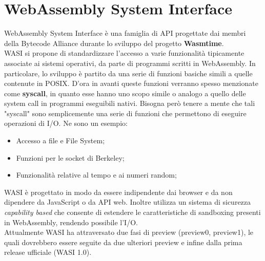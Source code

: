 \section{WebAssembly System Interface}
\label{sec:WASI}
WebAssembly System Interface è una famiglia di API progettate dai membri della Bytecode Alliance durante lo sviluppo del progetto \textbf{Wasmtime}.\cite*{wasiHome}
\\WASI si propone di standardizzare l'accesso a varie funzionalità tipicamente associate ai sistemi operativi, da parte di programmi scritti in WebAssembly.
In particolare, lo sviluppo è partito da una serie di funzioni basiche simili a quelle contenute in POSIX.
D'ora in avanti queste funzioni verranno spesso menzionate come \textbf{syscall}, in quanto esse hanno uno scopo simile o analogo a quello delle system call in programmi eseguibili nativi.
Bisogna però tenere a mente che tali "syscall" sono semplicemente una serie di funzioni che permettono di eseguire operazioni di I/O. Ne sono un esempio:
\begin{itemize}
        \item Accesso a file e File System;
        \item Funzioni per le socket di Berkeley;
        \item Funzionalità relative al tempo e ai numeri random;
\end{itemize}
WASI è progettato in modo da essere indipendente dai browser e da non dipendere da JavaScript o da API web. Inoltre utilizza un sistema di sicurezza \emph{capability based} che consente di estendere le caratteristiche di sandboxing presenti in WebAssembly, rendendo possibile l'I/O.
\\Attualmente WASI ha attraversato due fasi di preview (preview0, preview1), le quali dovrebbero essere seguite da due ulteriori preview e infine dalla prima release ufficiale (WASI 1.0).
